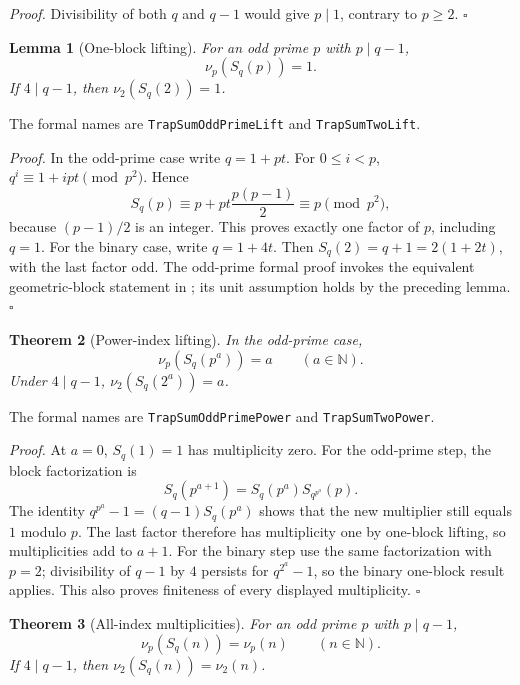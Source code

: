 \documentclass[11pt,letterpaper]{article}
\newcommand{\N}{\mathbb{N}}
\newtheorem{theorem}{Theorem}
\newtheorem{lemma}[theorem]{Lemma}
\newenvironment{proof}{\noindent\textit{Proof.}}{\hfill\(\square\)}
\begin{document}
\begin{proof}
Divisibility of both \(q\) and \(q-1\) would give \(p\mid1\),
contrary to \(p\ge2\).
\end{proof}

\begin{lemma}[One-block lifting]
For an odd prime \(p\) with \(p\mid q-1\),
\[
 \nu_p(S_q(p))=1.
\]
If \(4\mid q-1\), then \(\nu_2(S_q(2))=1\).
\end{lemma}

The formal names are \texttt{Trap\allowbreak Sum\allowbreak Odd\allowbreak Prime\allowbreak Lift} and
\texttt{Trap\allowbreak Sum\allowbreak Two\allowbreak Lift}.

\begin{proof}
In the odd-prime case write \(q=1+pt\). For \(0\le i<p\),
\(q^i\equiv1+ipt\pmod{p^2}\). Hence
\[
 S_q(p)\equiv p+pt\frac{p(p-1)}2\equiv p\pmod{p^2},
\]
because \((p-1)/2\) is an integer. This proves exactly one
factor of \(p\), including \(q=1\).
For the binary case, write \(q=1+4t\). Then
\(S_q(2)=q+1=2(1+2t)\), with the last factor odd.
The odd-prime formal proof invokes the equivalent geometric-block
statement in \cite{MathlibMultiplicity26}; its unit assumption holds
by the preceding lemma.
\end{proof}

\begin{theorem}[Power-index lifting]
In the odd-prime case,
\[
 \nu_p(S_q(p^a))=a\qquad(a\in\N).
\]
Under \(4\mid q-1\), \(\nu_2(S_q(2^a))=a\).
\end{theorem}

The formal names are \texttt{Trap\allowbreak Sum\allowbreak Odd\allowbreak Prime\allowbreak Power} and
\texttt{Trap\allowbreak Sum\allowbreak Two\allowbreak Power}.

\begin{proof}
At \(a=0\), \(S_q(1)=1\) has multiplicity zero.
For the odd-prime step, the block factorization is
\[
 S_q(p^{a+1})=S_q(p^a)S_{q^{p^a}}(p).
\]
The identity \(q^{p^a}-1=(q-1)S_q(p^a)\) shows that the new
multiplier still equals \(1\) modulo \(p\). The last factor
therefore has multiplicity one by one-block lifting, so
multiplicities add to \(a+1\). For the binary step use the same
factorization with \(p=2\); divisibility of \(q-1\) by \(4\)
persists for \(q^{2^a}-1\), so the binary one-block result applies.
This also proves finiteness of every displayed multiplicity.
\end{proof}

\begin{theorem}[All-index multiplicities]
For an odd prime \(p\) with \(p\mid q-1\),
\[
 \nu_p(S_q(n))=\nu_p(n)\qquad(n\in\N).
\]
If \(4\mid q-1\), then \(\nu_2(S_q(n))=\nu_2(n)\).
\end{theorem}
\end{document}
